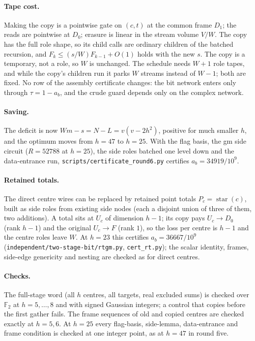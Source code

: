 \documentclass[11pt]{article}
\theoremstyle{remark}\newtheorem*{remark}{Remark}
\begin{document}
\paragraph{Tape cost.} Making the copy is a pointwise gate on $(c,t)$ at the common frame $D_1$; the reads are pointwise
at $D_0$; erasure is linear in the stream volume $V/W$. The copy has the full role shape, so its child calls are ordinary
children of the batched recursion, and $F_k\le(s/W)F_{k-1}+O(1)$ holds with the new $s$. The copy is a temporary, not a
role, so $W$ is unchanged. The schedule needs $W+1$ role tapes, and while the copy's children run it parks $W$ streams
instead of $W-1$; both are fixed. No row of the assembly certificate changes: the bit network enters only through
$\tau=1-a_b$, and the crude guard depends only on the complex network.

\paragraph{Saving.} The deficit is now $Wm-s=N-L=v(v-2h^2)$, positive for much smaller $h$, and the optimum moves from
$h=47$ to $h=25$. With the flag basis, the gm side circuit ($R=52788$ at $h=25$), the side roles batched one level down
and the data-entrance run, \texttt{scripts/certificate\_round6.py} certifies $a_b=34919/10^9$.

\paragraph{Retained totals.} The direct centre wires can be replaced by retained point totals
$P_c=\operatorname{star}(c)$, built as side roles from existing side nodes (each a disjoint union of three of them, two
additions). A total sits at $U_c$ of dimension $h-1$; its copy pays $U_c\to D_0$ (rank $h-1$) and the original
$U_c\to F$ (rank $1$), so the loss per centre is $h-1$ and the centre roles leave $W$. At $h=23$ this certifies
$a_b=36667/10^9$ (\texttt{independent/two-stage-bit/rtgm.py}, \texttt{cert\_rt.py}); the scalar identity, frames,
side-edge genericity and nesting are checked as for direct centres.

\paragraph{Checks.} The full-stage word (all $h$ centres, all targets, real excluded sums) is checked over
$\mathbb F_2$ at $h=5,\dots,8$ and with signed Gaussian integers; a control that copies before the first gather fails.
The frame sequences of old and copied centres are checked exactly at $h=5,6$. At $h=25$ every flag-basis, side-lemma,
data-entrance and frame condition is checked at one integer point, as at $h=47$ in round five.
\end{document}
